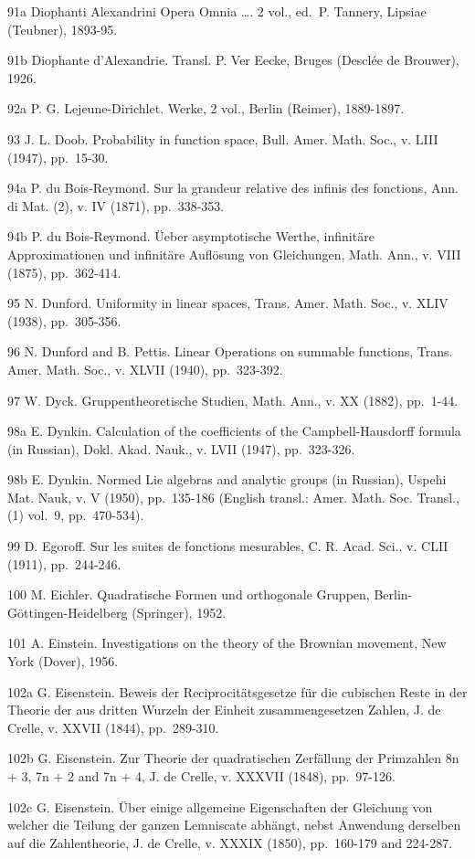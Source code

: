 91a Diophanti Alexandrini Opera Omnia \ldots. 2 vol., ed.~P. Tannery, Lipsiae (Teubner), 1893-95.

91b Diophante d'Alexandrie. Transl. P. Ver Eecke, Bruges (Desclée de Brouwer), 1926.

92a P. G. Lejeune-Dirichlet. Werke, 2 vol., Berlin (Reimer), 1889-1897.

93 J. L. Doob. Probability in function space, Bull. Amer. Math. Soc., v. LIII (1947), pp.~15-30.

94a P. du Bois-Reymond. Sur la grandeur relative des infinis des fonctions, Ann. di Mat. (2), v. IV (1871), pp.~338-353.

94b P. du Bois-Reymond. Üeber asymptotische Werthe, infinitäre Approximationen und infinitäre Auflösung von Gleichungen, Math. Ann., v. VIII (1875), pp.~362-414.

95 N. Dunford. Uniformity in linear spaces, Trans. Amer. Math. Soc., v. XLIV (1938), pp.~305-356.

96 N. Dunford and B. Pettis. Linear Operations on summable functions, Trans. Amer. Math. Soc., v. XLVII (1940), pp.~323-392.

97 W. Dyck. Gruppentheoretische Studien, Math. Ann., v. XX (1882), pp.~1-44.

98a E. Dynkin. Calculation of the coefficients of the Campbell-Hausdorff formula (in Russian), Dokl. Akad. Nauk., v. LVII (1947), pp.~323-326.

98b E. Dynkin. Normed Lie algebras and analytic groups (in Russian), Uspehi Mat. Nauk, v. V (1950), pp.~135-186 (English transl.: Amer. Math. Soc. Transl., (1) vol.~9, pp.~470-534).

99 D. Egoroff. Sur les suites de fonctions mesurables, C. R. Acad. Sci., v. CLII (1911), pp.~244-246.

100 M. Eichler. Quadratische Formen und orthogonale Gruppen, Berlin-Göttingen-Heidelberg (Springer), 1952.

101 A. Einstein. Investigations on the theory of the Brownian movement, New York (Dover), 1956.

102a G. Eisenstein. Beweis der Reciprocitätsgesetze für die cubischen Reste in der Theorie der aus dritten Wurzeln der Einheit zusammengesetzen Zahlen, J. de Crelle, v. XXVII (1844), pp.~289-310.

102b G. Eisenstein. Zur Theorie der quadratischen Zerfällung der Primzahlen 8n + 3, 7n + 2 and 7n + 4, J. de Crelle, v. XXXVII (1848), pp.~97-126.

102c G. Eisenstein. Über einige allgemeine Eigenschaften der Gleichung von welcher die Teilung der ganzen Lemniscate abhängt, nebst Anwendung derselben auf die Zahlentheorie, J. de Crelle, v. XXXIX (1850), pp.~160-179 and 224-287.

